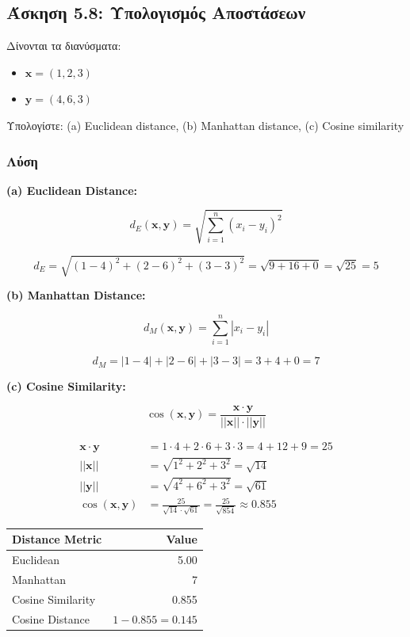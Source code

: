 \subsection{Άσκηση 5.8: Υπολογισμός Αποστάσεων}

\begin{formulabox}[Εκφώνηση]
Δίνονται τα διανύσματα:
\begin{itemize}
    \item $\mathbf{x} = (1, 2, 3)$
    \item $\mathbf{y} = (4, 6, 3)$
\end{itemize}

Υπολογίστε: (a) Euclidean distance, (b) Manhattan distance, (c) Cosine similarity
\end{formulabox}

\subsubsection*{Λύση}

\textbf{(a) Euclidean Distance:}

$$d_E(\mathbf{x}, \mathbf{y}) = \sqrt{\sum_{i=1}^{n} (x_i - y_i)^2}$$

$$d_E = \sqrt{(1-4)^2 + (2-6)^2 + (3-3)^2} = \sqrt{9 + 16 + 0} = \sqrt{25} = 5$$

\textbf{(b) Manhattan Distance:}

$$d_M(\mathbf{x}, \mathbf{y}) = \sum_{i=1}^{n} |x_i - y_i|$$

$$d_M = |1-4| + |2-6| + |3-3| = 3 + 4 + 0 = 7$$

\textbf{(c) Cosine Similarity:}

$$\cos(\mathbf{x}, \mathbf{y}) = \frac{\mathbf{x} \cdot \mathbf{y}}{||\mathbf{x}|| \cdot ||\mathbf{y}||}$$

\begin{align*}
\mathbf{x} \cdot \mathbf{y} &= 1 \cdot 4 + 2 \cdot 6 + 3 \cdot 3 = 4 + 12 + 9 = 25 \\
||\mathbf{x}|| &= \sqrt{1^2 + 2^2 + 3^2} = \sqrt{14} \\
||\mathbf{y}|| &= \sqrt{4^2 + 6^2 + 3^2} = \sqrt{61} \\
\cos(\mathbf{x}, \mathbf{y}) &= \frac{25}{\sqrt{14} \cdot \sqrt{61}} = \frac{25}{\sqrt{854}} \approx 0.855
\end{align*}

\begin{center}
\begin{tabular}{lr}
\toprule
\textbf{Distance Metric} & \textbf{Value} \\
\midrule
Euclidean & 5.00 \\
Manhattan & 7 \\
Cosine Similarity & 0.855 \\
Cosine Distance & $1 - 0.855 = 0.145$ \\
\bottomrule
\end{tabular}
\end{center}


